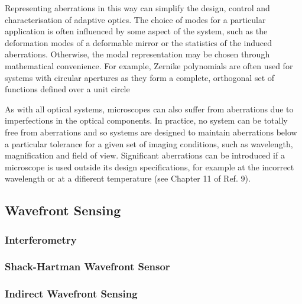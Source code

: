 Representing aberrations in this way can simplify the design, control and 
characterisation of adaptive optics. The choice of modes for a particular 
application is often influenced by some aspect of the system, such as the 
deformation modes of a deformable mirror or the statistics of the induced 
aberrations. Otherwise, the modal representation may be chosen through 
mathematical convenience. For example, Zernike polynomials are often used for 
systems with circular apertures as they form a complete, orthogonal set of 
functions defined over a unit circle

As with all optical systems, microscopes can also suffer from aberrations due 
to imperfections in the optical components. In practice, no system can be 
totally free from aberrations and so systems are designed to maintain 
aberrations below a particular tolerance for a given set of imaging 
conditions, such as wavelength, magnification and field of view. Significant 
aberrations can be introduced if a microscope is used outside its design 
specifications, for example at the incorrect wavelength or at a difierent 
temperature (see Chapter 11 of Ref. 9).

\cite{AOM_basic_ref}


\subsection{Wavefront Sensing}
\label{sec:WavefrontSensing}

\subsubsection{Interferometry}
\label{sec:DirectWavefrontSensing_interferometry}

\subsubsection{Shack-Hartman Wavefront Sensor}
\label{sec:DirectWavefrontSensing_SHWS}

\subsubsection{Indirect Wavefront Sensing}
\label{sec:IndirectWavefrontSensing}

